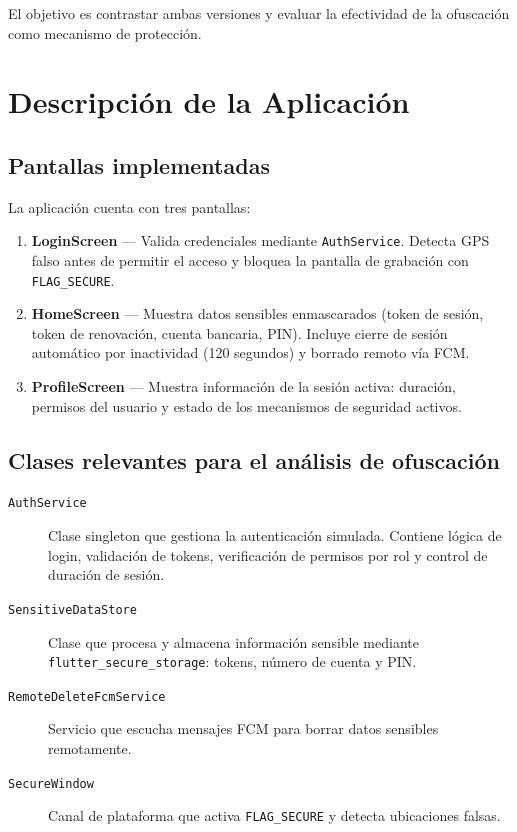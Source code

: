 \documentclass[12pt,a4paper]{article}
\begin{document}
El objetivo es contrastar ambas versiones y evaluar la efectividad de la ofuscación como mecanismo de protección.

\section{Descripción de la Aplicación}

\subsection{Pantallas implementadas}

La aplicación cuenta con tres pantallas:

\begin{enumerate}
  \item \textbf{LoginScreen} — Valida credenciales mediante \texttt{AuthService}. Detecta GPS falso antes de permitir el acceso y bloquea la pantalla de grabación con \texttt{FLAG\_SECURE}.
  \item \textbf{HomeScreen} — Muestra datos sensibles enmascarados (token de sesión, token de renovación, cuenta bancaria, PIN). Incluye cierre de sesión automático por inactividad (120 segundos) y borrado remoto vía FCM.
  \item \textbf{ProfileScreen} — Muestra información de la sesión activa: duración, permisos del usuario y estado de los mecanismos de seguridad activos.
\end{enumerate}

\subsection{Clases relevantes para el análisis de ofuscación}

\begin{description}
  \item[\texttt{AuthService}] Clase singleton que gestiona la autenticación simulada. Contiene lógica de login, validación de tokens, verificación de permisos por rol y control de duración de sesión.
  \item[\texttt{SensitiveDataStore}] Clase que procesa y almacena información sensible mediante \texttt{flutter\_secure\_storage}: tokens, número de cuenta y PIN.
  \item[\texttt{RemoteDeleteFcmService}] Servicio que escucha mensajes FCM para borrar datos sensibles remotamente.
  \item[\texttt{SecureWindow}] Canal de plataforma que activa \texttt{FLAG\_SECURE} y detecta ubicaciones falsas.
\end{description}
\end{document}
